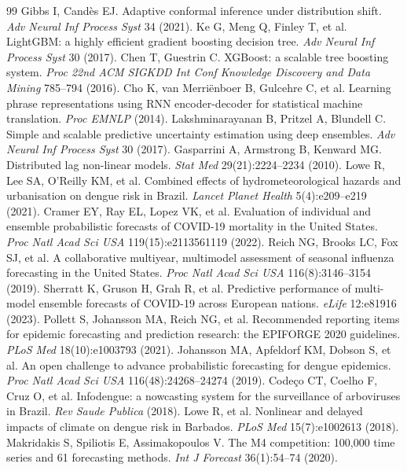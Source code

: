 \documentclass[11pt]{article}
\begin{document}
\begin{thebibliography}{99}
 Gibbs I, Cand\`es EJ. Adaptive conformal inference under distribution shift. \emph{Adv Neural Inf Process Syst} 34 (2021).
 Ke G, Meng Q, Finley T, et al. LightGBM: a highly efficient gradient boosting decision tree. \emph{Adv Neural Inf Process Syst} 30 (2017).
 Chen T, Guestrin C. XGBoost: a scalable tree boosting system. \emph{Proc 22nd ACM SIGKDD Int Conf Knowledge Discovery and Data Mining} 785--794 (2016).
 Cho K, van Merri\"enboer B, Gulcehre C, et al. Learning phrase representations using RNN encoder-decoder for statistical machine translation. \emph{Proc EMNLP} (2014).
 Lakshminarayanan B, Pritzel A, Blundell C. Simple and scalable predictive uncertainty estimation using deep ensembles. \emph{Adv Neural Inf Process Syst} 30 (2017).
 Gasparrini A, Armstrong B, Kenward MG. Distributed lag non-linear models. \emph{Stat Med} 29(21):2224--2234 (2010).
 Lowe R, Lee SA, O'Reilly KM, et al. Combined effects of hydrometeorological hazards and urbanisation on dengue risk in Brazil. \emph{Lancet Planet Health} 5(4):e209--e219 (2021).
 Cramer EY, Ray EL, Lopez VK, et al. Evaluation of individual and ensemble probabilistic forecasts of COVID-19 mortality in the United States. \emph{Proc Natl Acad Sci USA} 119(15):e2113561119 (2022).
 Reich NG, Brooks LC, Fox SJ, et al. A collaborative multiyear, multimodel assessment of seasonal influenza forecasting in the United States. \emph{Proc Natl Acad Sci USA} 116(8):3146--3154 (2019).
 Sherratt K, Gruson H, Grah R, et al. Predictive performance of multi-model ensemble forecasts of COVID-19 across European nations. \emph{eLife} 12:e81916 (2023).
 Pollett S, Johansson MA, Reich NG, et al. Recommended reporting items for epidemic forecasting and prediction research: the EPIFORGE 2020 guidelines. \emph{PLoS Med} 18(10):e1003793 (2021).
 Johansson MA, Apfeldorf KM, Dobson S, et al. An open challenge to advance probabilistic forecasting for dengue epidemics. \emph{Proc Natl Acad Sci USA} 116(48):24268--24274 (2019).
 Codeço CT, Coelho F, Cruz O, et al. Infodengue: a nowcasting system for the surveillance of arboviruses in Brazil. \emph{Rev Saude Publica} (2018).
 Lowe R, et al. Nonlinear and delayed impacts of climate on dengue risk in Barbados. \emph{PLoS Med} 15(7):e1002613 (2018).
 Makridakis S, Spiliotis E, Assimakopoulos V. The M4 competition: 100,000 time series and 61 forecasting methods. \emph{Int J Forecast} 36(1):54--74 (2020).

\end{thebibliography}
\end{document}
